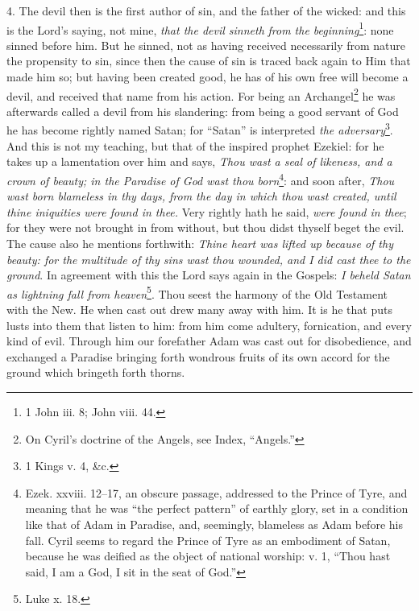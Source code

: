 4. The devil then is the first author of sin, and the father of the wicked: and this is the Lord’s saying, not mine, \emph{that the devil sinneth} \emph{from the beginning}\footnote{1 John iii. 8; John viii. 44.}: none sinned before him. But he sinned, not as having received necessarily from nature the propensity to sin, since then the cause of sin is traced back again to Him that made him so; but having been created good, he has of his own free will become a devil, and received that name from his action. For being an Archangel\footnote{On Cyril’s doctrine of the Angels, see Index, “Angels.”} he was afterwards called a devil from his slandering: from being a good servant of God he has become rightly named Satan; for “Satan” is interpreted \emph{the adversary}\footnote{1 Kings v. 4, \&c.}. And this is not my teaching, but that of the inspired prophet Ezekiel: for he takes up a lamentation over him and says, \emph{Thou wast a seal of likeness, and a crown of beauty; in the Paradise of God wast thou born}\footnote{Ezek. xxviii. 12–17, an obscure passage, addressed to the Prince of Tyre, and meaning that he was “the perfect pattern” of earthly glory, set in a condition like that of Adam in Paradise, and, seemingly, blameless as Adam before his fall. Cyril seems to regard the Prince of Tyre as an embodiment of Satan, because he was deified as the object of national worship: v. 1, “Thou hast said, I am a God, I sit in the seat of God.”}: and soon after, \emph{Thou wast born blameless in thy days, from the day in which thou wast created, until thine iniquities were found in thee.} Very rightly hath he said, \emph{were found in thee}; for they were not brought in from without, but thou didst thyself beget the evil. The cause also he mentions forthwith: \emph{Thine heart was lifted up because of thy beauty: for the multitude of thy sins wast thou wounded, and I did cast thee to the ground}. In agreement with this the Lord says again in the Gospels: \emph{I beheld Satan as lightning fall from heaven}\footnote{Luke x. 18.}. Thou seest the harmony of the Old Testament with the New. He when cast out drew many away with him. It is he that puts lusts into them that listen to him: from him come adultery, fornication, and every kind of evil. Through him our forefather Adam was cast out for disobedience, and exchanged a Paradise bringing forth wondrous fruits of its own accord for the ground which bringeth forth thorns.

